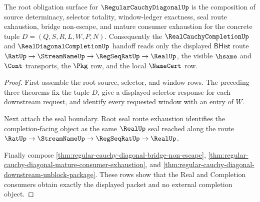 \begin{theorem}
\label{thm:regular-cauchy-diagonal-root-downstream-unblock-package}
The root obligation surface for $\RegularCauchyDiagonalUp$ is the composition of source determinacy, selector totality, window-ledger exactness, seal route exhaustion, bridge non-escape, and mature consumer exhaustion for the concrete tuple $D=(Q,S,R,L,W,P,N)$. Consequently the $\RealCauchyCompletionUp$ and $\RealDiagonalCompletionUp$ handoff reads only the displayed $\mathsf{BHist}$ route $\RatUp \to \StreamNameUp \to \RegSeqRatUp \to \RealUp$, the visible $\hsame$ and $\Cont$ transports, the $\Pkg$ row, and the local $\NameCert$ row.
\end{theorem}
\begin{proof}
First assemble the root source, selector, and window rows. The preceding three theorems fix the tuple $D$, give a displayed selector response for each downstream request, and identify every requested window with an entry of $W$.

Next attach the seal boundary. Root seal route exhaustion identifies the completion-facing object as the same $\RealUp$ seal reached along the route $\RatUp \to \StreamNameUp \to \RegSeqRatUp \to \RealUp$.

Finally compose \autoref{thm:regular-cauchy-diagonal-bridge-non-escape}, \autoref{thm:regular-cauchy-diagonal-mature-consumer-exhaustion}, and \autoref{thm:regular-cauchy-diagonal-downstream-unblock-package}. These rows show that the Real and Completion consumers obtain exactly the displayed packet and no external completion object.
\end{proof}

